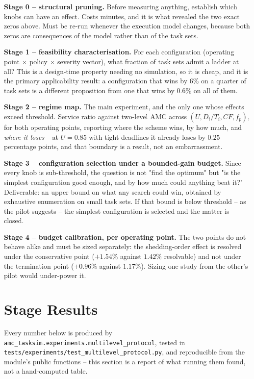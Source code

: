 \documentclass{article}
\begin{document}
\textbf{Stage 0 -- structural pruning.} Before measuring anything, establish
which knobs can have an effect. Costs minutes, and it is what revealed the two
exact zeros above. Must be re-run whenever the execution model changes, because
both zeros are consequences of the model rather than of the task sets.

\textbf{Stage 1 -- feasibility characterisation.} For each configuration
(operating point $\times$ policy $\times$ severity vector), what fraction of
task sets admit a ladder at all? This is a design-time property needing no
simulation, so it is cheap, and it is the primary applicability result: a
configuration that wins by $6\%$ on a quarter of task sets is a different
proposition from one that wins by $0.6\%$ on all of them.

\textbf{Stage 2 -- regime map.} The main experiment, and the only one whose
effects exceed threshold. Service ratio against two-level AMC across
$(U, D_i/T_i, CF, f_p)$, for both operating points, reporting where the scheme
wins, by how much, and \emph{where it loses} -- at $U = 0.85$ with tight
deadlines it already loses by $0.25$ percentage points, and that boundary is a
result, not an embarrassment.

\textbf{Stage 3 -- configuration selection under a bounded-gain budget.} Since
every knob is sub-threshold, the question is not "find the optimum" but "is the
simplest configuration good enough, and by how much could anything beat it?"
Deliverable: an upper bound on what any search could win, obtained by exhaustive
enumeration on small task sets. If that bound is below threshold -- as the pilot
suggests -- the simplest configuration is selected and the matter is closed.

\textbf{Stage 4 -- budget calibration, per operating point.} The two points do
not behave alike and must be sized separately: the shedding-order effect is
resolved under the conservative point ($+1.54\%$ against $1.42\%$ resolvable)
and not under the termination point ($+0.96\%$ against $1.17\%$). Sizing one
study from the other's pilot would under-power it.

\section{Stage Results}
\label{sec:stage-results}

Every number below is produced by
\texttt{amc\_tasksim.experiments.multilevel\_protocol}, tested in
\texttt{tests/experiments/test\_multilevel\_protocol.py}, and reproducible from
the module's public functions -- this section is a report of what running them
found, not a hand-computed table.
\end{document}

